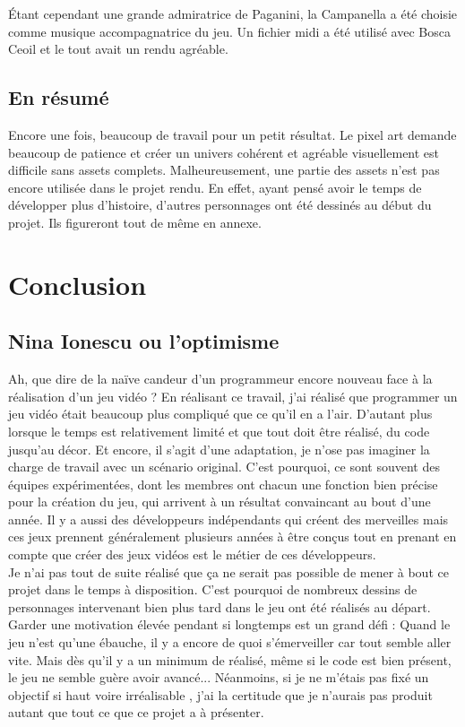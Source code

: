 \documentclass[11pt]{article}
\begin{document}
Étant cependant une grande admiratrice de Paganini, la Campanella a été choisie comme musique accompagnatrice du jeu. Un fichier midi a été utilisé avec Bosca Ceoil et le tout avait un rendu agréable.  
\subsection{En résumé}
Encore une fois, beaucoup de travail pour un petit résultat. Le pixel art demande beaucoup de patience et créer un univers cohérent et agréable visuellement est difficile sans assets complets. Malheureusement, une partie des assets n'est pas encore utilisée dans le projet rendu. En effet, ayant pensé avoir le temps de développer plus d'histoire, d'autres personnages ont été dessinés au début du projet. Ils figureront tout de même en annexe.
\section{Conclusion}
\subsection{Nina Ionescu ou l'optimisme} 
Ah, que dire de la naïve candeur d'un programmeur encore nouveau face à la réalisation d'un jeu vidéo ? En réalisant ce travail, j'ai réalisé que programmer un jeu vidéo était beaucoup plus compliqué que ce qu'il en a l'air. D'autant plus lorsque le temps est relativement limité et que tout doit être réalisé, du code jusqu'au décor. Et encore, il s'agit d'une adaptation, je n'ose pas imaginer la charge de travail avec un scénario original. C'est pourquoi, ce sont souvent des équipes expérimentées, dont les membres ont chacun une fonction bien précise pour la création du jeu, qui arrivent à un résultat convaincant au bout d'une année. Il y a aussi des développeurs indépendants qui créent des merveilles mais ces jeux prennent généralement plusieurs années à être conçus tout en prenant en compte que créer des jeux vidéos est le métier de ces développeurs. \\

Je n'ai pas tout de suite réalisé que ça ne serait pas possible de mener à bout ce projet dans le temps à disposition. C'est pourquoi de nombreux dessins de personnages intervenant bien plus tard dans le jeu ont été réalisés au départ. Garder une motivation élevée pendant si longtemps est un grand défi : Quand le jeu n'est qu'une ébauche, il y a encore de quoi s'émerveiller car tout semble aller vite. Mais dès qu'il y a un minimum de réalisé, même si le code est bien présent, le jeu ne semble guère avoir avancé... Néanmoins, si je ne m'étais pas fixé un objectif si haut voire irréalisable , j'ai la certitude que je n'aurais pas produit autant que tout ce que ce projet a à présenter.
\end{document}

